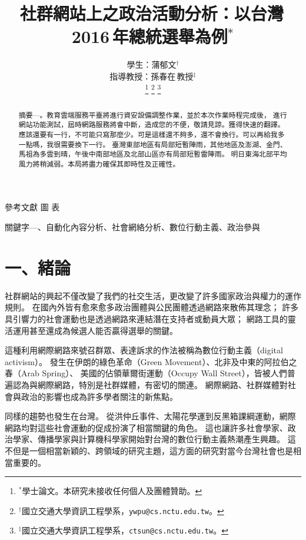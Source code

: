 \documentclass[letterpaper, 10pt, conference]{ieeeconf}   %
\title{\LARGE \bf
社群網站上之政治活動分析：以台灣\,2016\,年總統選舉為例$^{\ast}$
}
\author{\parbox{3 in}{\centering 學生：蒲郁文$^{\dagger}$}
        \hspace*{0.5 in}
        \parbox{3 in}{\centering 指導教授：孫春在\,教授$^{\ddagger}$}
        \thanks{$^{\ast}$學士論文。本研究未接收任何個人及團體贊助。}
        \thanks{$^{\dagger}$國立交通大學資訊工程學系，{\tt\small ywpu@cs.nctu.edu.tw}。}
        \thanks{$^{\ddagger}$國立交通大學資訊工程學系，{\tt\small ctsun@cs.nctu.edu.tw}。}
}
\begin{document}
\begin{CJK}{UTF8}{bsmi}
\onehalfspacing
\refname{參考文獻}
\figurename{圖}
\tablename{表}

\maketitle
\thispagestyle{empty}
\pagestyle{empty}


\begin{abstract}
摘要\enskip---。教育雲端服務平臺將進行資安設備調整作業，並於本次作業時程完成後，
進行網站功能測試，屆時網路服務將會中斷，造成您的不便，敬請見諒。獲得快速的翻譯。
應該還要有一行，不可能只寫那麼少。可是這樣還不夠多，還不會換行。可以再給我多一點嗎，我很需要換下一行。
臺灣東部地區有局部短暫陣雨，其他地區及澎湖、金門、馬祖為多雲到晴，午後中南部地區及北部山區亦有局部短暫雷陣雨。
明日東海北部平均風力將稍減弱。本局將盡力確保其即時性及正確性。
\end{abstract}

\begin{keywords}
關鍵字\enskip---、自動化內容分析、社會網絡分析、數位行動主義、政治參與
\end{keywords}


\section*{一、緒論}

社群網站的興起不僅改變了我們的社交生活，更改變了許多國家政治與權力的運作規則。
在國內外皆有愈來愈多政治團體與公民團體透過網路來散佈其理念；
許多具引響力的社會運動也是透過網路來連結潛在支持者或動員大眾；
網路工具的靈活運用甚至還成為候選人能否贏得選舉的關鍵。

這種利用網際網路來號召群眾、表達訴求的作法被稱為數位行動主義（digital activism）。
發生在伊朗的綠色革命（Green Movement）、北非及中東的阿拉伯之春（Arab Spring）、
美國的佔領華爾街運動（Occupy Wall Street），皆被人們普遍認為與網際網路，特別是社群媒體，有密切的關連。
網際網路、社群媒體對社會與政治的影響也成為許多學者關注的新焦點。

同樣的趨勢也發生在台灣。
從洪仲丘事件、太陽花學運到反黑箱課綱運動，網際網路均對這些社會運動的促成扮演了相當關鍵的角色。
這也讓許多社會學家、政治學家、傳播學家與計算機科學家開始對台灣的數位行動主義熱潮產生興趣。
這不但是一個相當新穎的、跨領域的研究主題，這方面的研究對當今台灣社會也是相當重要的。


\end{CJK}
\end{document}
